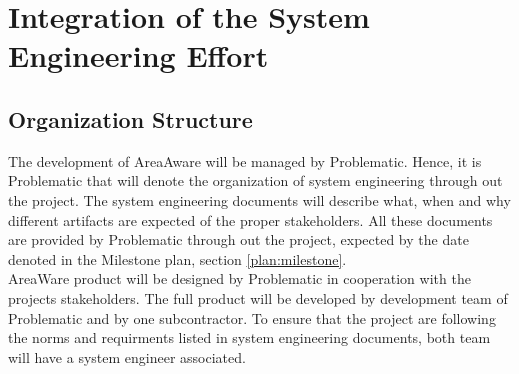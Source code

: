 %
\thispagestyle{fancy}
\chapter{Integration of the System Engineering Effort}
\label{chp:int_se_effort}

\section{Organization Structure}
The development of AreaAware will be managed by Problematic.
Hence, it is Problematic that will denote the organization of system engineering through out the project.
The system engineering documents will describe what, when and why different artifacts are expected of the proper stakeholders.
All these documents are provided by Problematic through out the project, expected by the date denoted in the Milestone plan, section \ref{plan:milestone}.\\


\noindent AreaWare product will be designed by Problematic in cooperation with the projects stakeholders.
The full product will be developed by development team of Problematic and by one subcontractor.
To ensure that the project are following the norms and requirments listed in system engineering documents, both team will have a system engineer associated.
